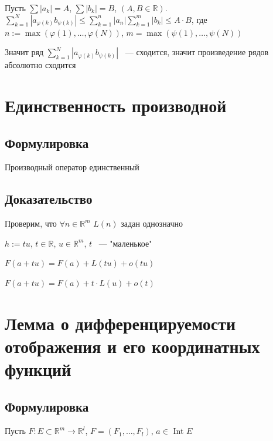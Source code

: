 \documentclass{article}
\begin{document}
            Пусть $\sum |a_k| = A$, $\sum |b_k| = B$, $(A, B \in \mathbb{R})$. $\sum\limits^N_{k = 1} |a_{\varphi(k)} b_{\psi(k)}| \leq \sum\limits^n_{k = 1} |a_n| \sum\limits^m_{k = 1} |b_k| \leq A \cdot B$, где $n := \max(\varphi(1), \ldots, \varphi(N))$, $m = \max(\psi(1), \ldots, \psi(N))$
            
            Значит ряд $\sum\limits^N_{k = 1} |a_{\varphi(k)} b_{\psi(k)}|$ ~--- сходится, значит произведение рядов абсолютно сходится
            
    \newpage
    
    \section{Единственность производной}
    
        \subsection{Формулировка}
        
            Производный оператор единственный
            
        \subsection{Доказательство}
        
            Проверим, что $\forall n \in \mathbb{R}^m$ $L(n)$ задан однозначно
            
            $h := tu$, $t \in \mathbb{R}$, $u \in \mathbb{R}^m$, $t$ ~--- "маленькое"
            
            $F(a + tu) = F(a) + L(tu) + o(tu)$
            
            $F(a + tu) = F(a) + t \cdot L(u) + o(t)$
            
    \newpage
    
    \section{Лемма о дифференцируемости отображения и его координатных функций}
    
        \subsection{Формулировка}
        
            Пусть $F : E \subset \mathbb{R}^m \rightarrow \mathbb{R}^l$, $F = (F_1, \ldots, F_l)$, $a \in$ Int $E$
        
\end{document}

